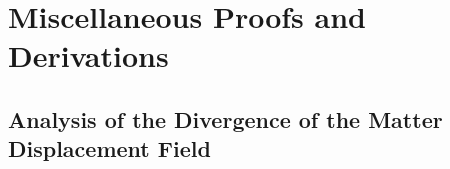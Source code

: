 \documentclass{article}
\begin{document}






% 









% 











% 











\section{Miscellaneous Proofs and Derivations}

\subsection{Analysis of the Divergence of the Matter Displacement Field}\label{app:polarizationDivergence}
\end{document}
